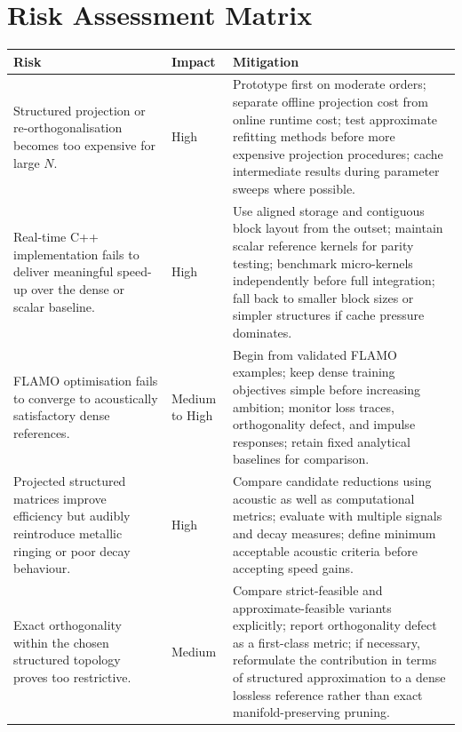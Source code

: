 \documentclass[12pt,a4paper]{article}
\begin{document}
\section{Risk Assessment Matrix}

\begin{center}
\captionsetup{type=table}
\label{tab:risk}
\begin{tabular}{|p{4.4cm}|p{1.8cm}|p{8.0cm}|}
\toprule
\textbf{Risk} & \textbf{Impact} & \textbf{Mitigation} \\
\midrule
Structured projection or re-orthogonalisation becomes too expensive for large $N$. & High & Prototype first on moderate orders; separate offline projection cost from online runtime cost; test approximate refitting methods before more expensive projection procedures; cache intermediate results during parameter sweeps where possible. \\
Real-time C++ implementation fails to deliver meaningful speed-up over the dense or scalar baseline. & High & Use aligned storage and contiguous block layout from the outset; maintain scalar reference kernels for parity testing; benchmark micro-kernels independently before full integration; fall back to smaller block sizes or simpler structures if cache pressure dominates. \\
FLAMO optimisation fails to converge to acoustically satisfactory dense references. & Medium to High & Begin from validated FLAMO examples; keep dense training objectives simple before increasing ambition; monitor loss traces, orthogonality defect, and impulse responses; retain fixed analytical baselines for comparison. \\
Projected structured matrices improve efficiency but audibly reintroduce metallic ringing or poor decay behaviour. & High & Compare candidate reductions using acoustic as well as computational metrics; evaluate with multiple signals and decay measures; define minimum acceptable acoustic criteria before accepting speed gains. \\
Exact orthogonality within the chosen structured topology proves too restrictive. & Medium & Compare strict-feasible and approximate-feasible variants explicitly; report orthogonality defect as a first-class metric; if necessary, reformulate the contribution in terms of structured approximation to a dense lossless reference rather than exact manifold-preserving pruning. \\
\bottomrule
\end{tabular}
\end{center}
\end{document}
